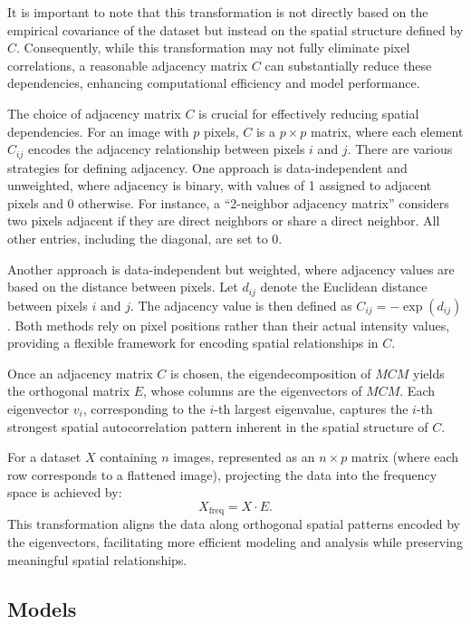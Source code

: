\documentclass[12pt]{article}
\begin{document}
It is important to note that this transformation is not directly based on the empirical covariance of the dataset but instead on the spatial structure defined by \( C \). Consequently, while this transformation may not fully eliminate pixel correlations, a reasonable adjacency matrix \( C \) can substantially reduce these dependencies, enhancing computational efficiency and model performance.

The choice of adjacency matrix \( C \) is crucial for effectively reducing spatial dependencies. For an image with \( p \) pixels, \( C \) is a \( p \times p \) matrix, where each element \( C_{ij} \) encodes the adjacency relationship between pixels \( i \) and \( j \). There are various strategies for defining adjacency. One approach is data-independent and unweighted, where adjacency is binary, with values of 1 assigned to adjacent pixels and 0 otherwise. For instance, a ``2-neighbor adjacency matrix'' considers two pixels adjacent if they are direct neighbors or share a direct neighbor. All other entries, including the diagonal, are set to 0. 

Another approach is data-independent but weighted, where adjacency values are based on the distance between pixels. Let \( d_{ij} \) denote the Euclidean distance between pixels \( i \) and \( j \). The adjacency value is then defined as \( C_{ij} = -\exp(d_{ij}) \). Both methods rely on pixel positions rather than their actual intensity values, providing a flexible framework for encoding spatial relationships in \( C \).

Once an adjacency matrix \( C \) is chosen, the eigendecomposition of \( MCM \) yields the orthogonal matrix \( E \), whose columns are the eigenvectors of \( MCM \). Each eigenvector \( v_i \), corresponding to the \( i \)-th largest eigenvalue, captures the \( i \)-th strongest spatial autocorrelation pattern inherent in the spatial structure of \( C \).

For a dataset \( X \) containing \( n \) images, represented as an \( n \times p \) matrix (where each row corresponds to a flattened image), projecting the data into the frequency space is achieved by:
\[
  X_{\text{freq}} = X \cdot E.
\]
This transformation aligns the data along orthogonal spatial patterns encoded by the eigenvectors, facilitating more efficient modeling and analysis while preserving meaningful spatial relationships.



\subsection{Models}
\end{document}
